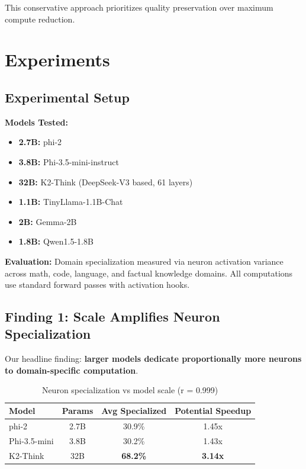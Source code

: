 \documentclass{article}
\begin{document}
This conservative approach prioritizes quality preservation over maximum compute reduction.

\section{Experiments}

\subsection{Experimental Setup}

\textbf{Models Tested:}
\begin{itemize}
    \item \textbf{2.7B:} phi-2
    \item \textbf{3.8B:} Phi-3.5-mini-instruct
    \item \textbf{32B:} K2-Think (DeepSeek-V3 based, 61 layers)
    \item \textbf{1.1B:} TinyLlama-1.1B-Chat
    \item \textbf{2B:} Gemma-2B
    \item \textbf{1.8B:} Qwen1.5-1.8B
\end{itemize}

\textbf{Evaluation:}
Domain specialization measured via neuron activation variance across math, code, language, and factual knowledge domains. All computations use standard forward passes with activation hooks.

\subsection{Finding 1: Scale Amplifies Neuron Specialization}

Our headline finding: \textbf{larger models dedicate proportionally more neurons to domain-specific computation}.

\begin{table}[h]
\centering
\caption{Neuron specialization vs model scale (r = 0.999)}
\label{tab:scale}
\begin{tabular}{lccc}
\toprule
\textbf{Model} & \textbf{Params} & \textbf{Avg Specialized} & \textbf{Potential Speedup} \\
\midrule
phi-2 & 2.7B & 30.9\% & 1.45x \\
Phi-3.5-mini & 3.8B & 30.2\% & 1.43x \\
K2-Think & 32B & \textbf{68.2\%} & \textbf{3.14x} \\
\bottomrule
\end{tabular}
\end{table}
\end{document}
